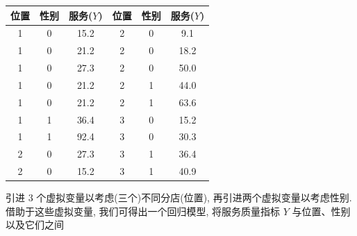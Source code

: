 \begin{mvtable}
\label{tab:7.2}
\begin{tabular}{ccc|ccc}
\hline
位置&性别&服务($Y$)&位置&性别&服务($Y$)\\
\hline
1&0&15.2&2&0&9.1\\
1&0&21.2&2&0&18.2\\
1&0&27.3&2&0&50.0\\
1&0&21.2&2&1&44.0\\
1&0&21.2&2&1&63.6\\
1&1&36.4&3&0&15.2\\
1&1&92.4&3&0&30.3\\
2&0&27.3&3&1&36.4\\
2&0&15.2&3&1&40.9\\
\hline
\end{tabular}
\end{mvtable}

引进 3 个虚拟变量以考虑(三个)不同分店(位置), 再引进两个虚拟变量以考虑性别. 借助于这些虚拟变量, 我们可得出一个回归模型, 将服务质量指标 $Y$ 与位置、性别以及它们之间
